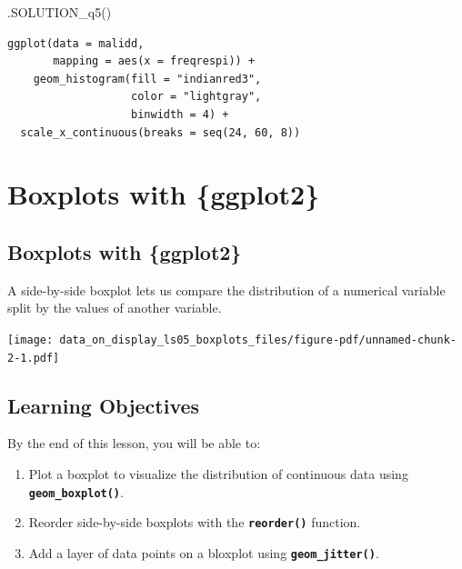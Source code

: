 \documentclass[
  letterpaper,
  DIV=11,
  numbers=noendperiod]{scrreprt}
\newenvironment{Shaded}{\begin{snugshade}}{\end{snugshade}}
\newcommand{\FunctionTok}[1]{\textcolor[rgb]{0.28,0.35,0.67}{#1}}
\newcommand{\NormalTok}[1]{\textcolor[rgb]{0.00,0.23,0.31}{#1}}
\providecommand{\tightlist}{%
  \setlength{\itemsep}{0pt}\setlength{\parskip}{0pt}}\usepackage{longtable,booktabs,array}
\begin{document}
\begin{Shaded}
\begin{Highlighting}[]
\FunctionTok{.SOLUTION\_q5}\NormalTok{()}
\end{Highlighting}
\end{Shaded}

\begin{verbatim}
ggplot(data = malidd, 
       mapping = aes(x = freqrespi)) +
    geom_histogram(fill = "indianred3",
                   color = "lightgray", 
                   binwidth = 4) +
  scale_x_continuous(breaks = seq(24, 60, 8))
\end{verbatim}


\hypertarget{boxplots-with-ggplot2}{%
\chapter{Boxplots with \{ggplot2\}}\label{boxplots-with-ggplot2}}

\hypertarget{boxplots-with-ggplot2-1}{%
\section{Boxplots with \{ggplot2\}}\label{boxplots-with-ggplot2-1}}

A side-by-side boxplot lets us compare the distribution of a numerical
variable split by the values of another variable.

\texttt{[image: data\_on\_display\_ls05\_boxplots\_files/figure-pdf/unnamed-chunk-2-1.pdf]}

\hypertarget{learning-objectives-4}{%
\section{Learning Objectives}\label{learning-objectives-4}}

By the end of this lesson, you will be able to:

\begin{enumerate}
\def\labelenumi{\arabic{enumi}.}
\tightlist
\item
  Plot a boxplot to visualize the distribution of continuous data using
  \textbf{\texttt{geom\_boxplot()}}.
\item
  Reorder side-by-side boxplots with the \textbf{\texttt{reorder()}}
  function.
\item
  Add a layer of data points on a bloxplot using
  \textbf{\texttt{geom\_jitter()}}.
\end{enumerate}
\end{document}
